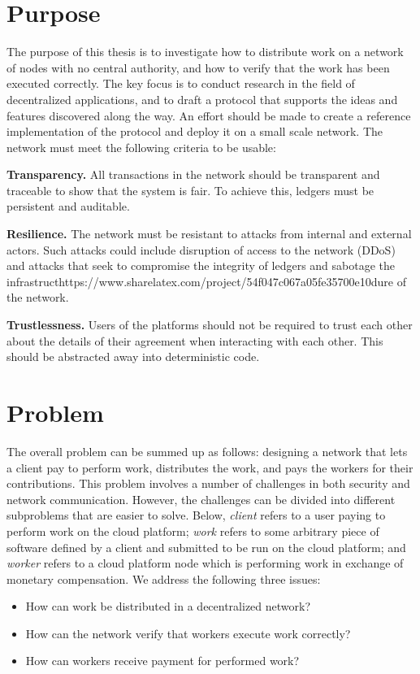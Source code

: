 \section{Purpose}
\label{sec:intro:purpose}
The purpose of this thesis is to investigate how to distribute work on a network of nodes with no central authority, and how to verify that the work has been executed correctly. The key focus is to conduct research in the field of decentralized applications, and to draft a protocol that supports the ideas and features discovered along the way. An effort should be made to create a reference implementation of the protocol and deploy it on a small scale network. The network must meet the following criteria to be usable:

\textbf{Transparency.} All transactions in the network should be transparent and traceable to show that the system is fair. To achieve this, ledgers must be persistent and auditable.

\textbf{Resilience.} The network must be resistant to attacks from internal and external actors. Such attacks could include disruption of access to the network (DDoS) and attacks that seek to compromise the integrity of ledgers and sabotage the infrastructhttps://www.sharelatex.com/project/54f047c067a05fe35700e10dure of the network.

\textbf{Trustlessness.} Users of the platforms should not be required to trust each other about the details of their agreement when interacting with each other. This should be abstracted away into deterministic code.

\section{Problem}
\label{sec:intro:problem}
The overall problem can be summed up as follows: designing a network that lets a client pay to perform work, distributes the work, and pays the workers for their contributions. This problem involves a number of challenges in both security and network communication. However, the challenges can be divided into different subproblems that are easier to solve. Below, \emph{client} refers to a user paying to perform work on the cloud platform; \emph{work} refers to some arbitrary piece of software defined by a client and submitted to be run on the cloud platform; and \emph{worker} refers to a cloud platform node which is performing work in exchange of monetary compensation.
We address the following three issues:
\begin{itemize}
\item How can work be distributed in a decentralized network?
\item How can the network verify that workers execute work correctly?
\item How can workers receive payment for performed work?
\end{itemize}

